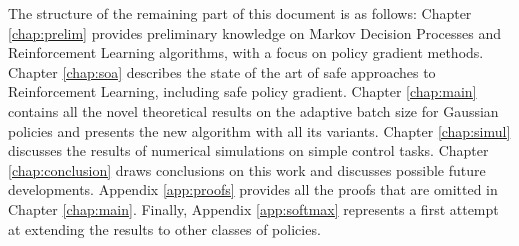 The structure of the remaining part of this document is as follows: Chapter \ref{chap:prelim} provides preliminary knowledge on Markov Decision Processes and Reinforcement Learning algorithms, with a focus on policy gradient methods. Chapter \ref{chap:soa} describes the state of the art of safe approaches to Reinforcement Learning, including safe policy gradient. Chapter \ref{chap:main} contains all the novel theoretical results on the adaptive batch size for Gaussian policies and presents the new algorithm with all its variants. Chapter \ref{chap:simul} discusses the results of numerical simulations on simple control tasks. Chapter \ref{chap:conclusion} draws conclusions on this work and discusses possible future developments.
Appendix \ref{app:proofs} provides all the proofs that are omitted in Chapter \ref{chap:main}. Finally, Appendix \ref{app:softmax} represents a first attempt at extending the results to other classes of policies.
